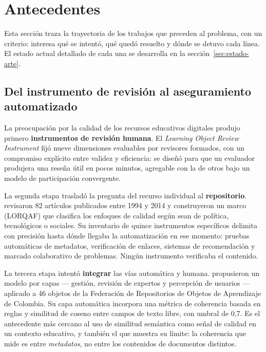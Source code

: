 \section{Antecedentes}
\label{sec:antecedentes}

Esta sección traza la trayectoria de los trabajos que preceden al problema, con un
criterio: interesa qué se intentó, qué quedó resuelto y dónde se detuvo cada línea.
El estado actual detallado de cada una se desarrolla en la sección~\ref{sec:estado-arte}.

\subsection{Del instrumento de revisión al aseguramiento automatizado}
\label{sec:ant-calidad}

La preocupación por la calidad de los recursos educativos digitales produjo primero
\textbf{instrumentos de revisión humana}. El
\emph{Learning Object Review Instrument} \parencite{leacock2007framework} fijó nueve
dimensiones evaluables por revisores formados, con un compromiso explícito entre
validez y eficiencia: se diseñó para que un evaluador produjera una reseña útil en
pocos minutos, agregable con la de otros bajo un modelo de participación convergente.

La segunda etapa trasladó la pregunta del recurso individual al
\textbf{repositorio}. \textcite{clements2015open} revisaron 82 artículos publicados
entre 1994 y 2014 y construyeron un marco (LORQAF) que clasifica los enfoques de
calidad según sean de política, tecnológicos o sociales. Su inventario de quince
instrumentos específicos delimita con precisión hasta dónde llegaba la automatización
en ese momento: pruebas automáticas de metadatos, verificación de enlaces, sistemas
de recomendación y marcado colaborativo de problemas. Ningún instrumento verificaba
el contenido.

La tercera etapa intentó \textbf{integrar} las vías automática y humana.
\textcite{tabares2017modelo} propusieron un modelo por capas --- gestión, revisión de
expertos y percepción de usuarios --- aplicado a 46 objetos de la Federación de
Repositorios de Objetos de Aprendizaje de Colombia. Su capa automática incorpora una
métrica de coherencia basada en reglas y similitud de coseno entre campos de texto
libre, con umbral de 0,7. Es el antecedente más cercano al uso de similitud semántica
como señal de calidad en un contexto educativo, y también el que muestra su límite:
la coherencia que mide es entre \emph{metadatos}, no entre los contenidos de
documentos distintos.


